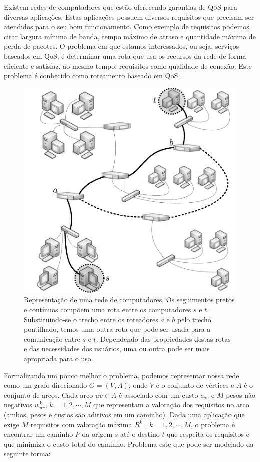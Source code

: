 Existem redes de computadores que estão oferecendo garantias de 
\textsc{QoS} para diversas aplicações. Estas aplicações possuem diversos 
requisitos que precisam ser atendidos para o seu bom funcionamento.  
Como exemplo de requisitos podemos citar largura mínima de banda, tempo 
máximo de atraso e quantidade máxima de perda de pacotes. O problema em 
que estamos interessados, ou seja, serviços baseados em QoS, é 
determinar uma rota que usa os recursos da rede de forma eficiente e 
satisfaz, ao mesmo tempo, requisitos como qualidade de conexão. Este 
problema é conhecido como roteamento baseado em QoS 
\citep{aurrecoechea:98}.

\begin{figure}[h!]
  \centering
  \includegraphics[scale=0.5]{figuras/pdf/qos.pdf}
  \caption[Representação de rotas em uma rede de 
  computadores]{Representação de uma rede de computadores. Os 
  seguimentos pretos e contínuos compõem uma rota entre os computadores 
  $s$ e $t$. Substituindo-se o trecho entre os roteadores $a$ e $b$ pelo 
  trecho pontilhado, temos uma outra rota que pode ser usada para a 
  comunicação entre $s$ e $t$. Dependendo das propriedades destas rotas 
  e das necessidades dos usuários, uma ou outra pode ser mais apropriada 
para o uso.}
  \label{fig:rscp_mochila}
\end{figure}

Formalizando um pouco melhor o problema, podemos representar nossa rede 
como um grafo direcionado $G = (V, A)$, onde $V$ é o
conjunto de vértices e $A$ é o conjunto de arcos. Cada arco $uv \in A$ é 
associado com um custo $c_{uv}$ e $M$ pesos não negativos  $w_{uv}^k$, 
$k=1,2,\cdots,M$ que representam a valoração dos requisitos no arco 
(ambos, pesos e custos são aditivos em um caminho).  Dada uma aplicação 
que exige $M$ requisitos com valoração máxima $R^k$ , $k = 1, 2, \cdots, 
M$, o problema é encontrar um caminho $P$ da origem $s$ até o destino 
$t$ que respeita os requisitos e que minimiza o custo total do caminho.  
Problema este que pode ser modelado da seguinte forma:

